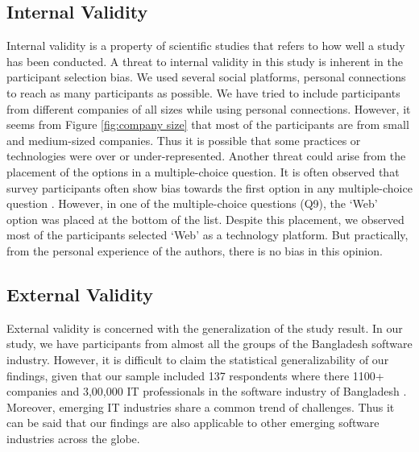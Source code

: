 \subsection{Internal Validity}
Internal validity is a property of scientific studies that refers to how well a study has been conducted. A threat to internal validity in this study is inherent in the participant selection bias. We used several social platforms, personal connections to reach as many participants as possible. We have tried to include participants from different companies of all sizes while using personal connections. However, it seems from Figure \ref{fig:company size} that most of the participants are from small and medium-sized companies.  Thus it is possible that some practices or technologies were over or under-represented. Another threat could arise from the placement of the options in a multiple-choice question. It is often observed that survey participants often show bias towards the first option in any multiple-choice question\cite{Uddin2019} . However, in one of the multiple-choice questions (Q9), the `Web' option was placed at the bottom of the list. Despite this placement, we observed most of the participants selected `Web' as a technology platform. But practically, from the personal experience of the authors, there is no bias in this opinion.


\subsection{External Validity}
External validity is concerned with the generalization of the study result. In our study, we have participants from almost all the groups of the Bangladesh software industry. However, it is difficult to claim the statistical generalizability of our findings, given that our sample included 137 respondents where there 1100+ companies and 3,00,000 IT professionals\cite{BASIS2018} in the software industry of Bangladesh . Moreover, emerging IT industries share a common trend of challenges\cite{Sison2006, lloyd2020}. Thus it can be said that our findings are also applicable to other emerging software industries across the globe.